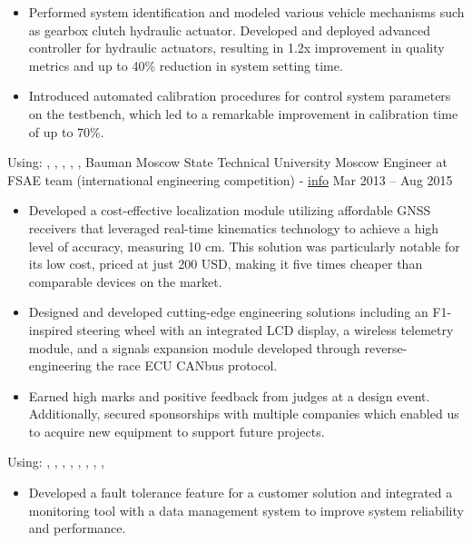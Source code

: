 \begin{itemize}
    \item Performed system identification and modeled various vehicle mechanisms such as gearbox clutch hydraulic actuator. Developed and deployed advanced controller for hydraulic actuators, resulting in 1.2x improvement in quality metrics and up to 40\% reduction in system setting time.
    \item Introduced automated calibration procedures for control system parameters on the testbench, which led to a remarkable improvement in calibration time of up to 70\%.
\end{itemize}
Using: , ,  , , , 
\horizontalline
% 
\ressubheading
{Bauman Moscow State Technical University}
{}
{Moscow}
{Engineer at FSAE team (international engineering competition) - \href{https://baumanracing.ru/en/}{info}}
{Mar 2013 -- Aug 2015}
\begin{itemize}
    \item Developed a cost-effective localization module utilizing affordable GNSS receivers that leveraged real-time kinematics technology to achieve a high level of accuracy, measuring 10 cm. This solution was particularly notable for its low cost, priced at just 200 USD, making it five times cheaper than comparable devices on the market.
    \item Designed and developed cutting-edge engineering solutions including an F1-inspired steering wheel with an integrated LCD display, a wireless telemetry module, and a signals expansion module developed through reverse-engineering the race ECU CANbus protocol.
    \item Earned high marks and positive feedback from judges at a design event. Additionally, secured sponsorships with multiple companies which enabled us to acquire new equipment to support future projects.
\end{itemize}
Using: , , , , , , , , 
\horizontalline
% 
\begin{itemize}
    \item Developed a fault tolerance feature for a customer solution and integrated a monitoring tool with a data management system to improve system reliability and performance.
\end{itemize}
